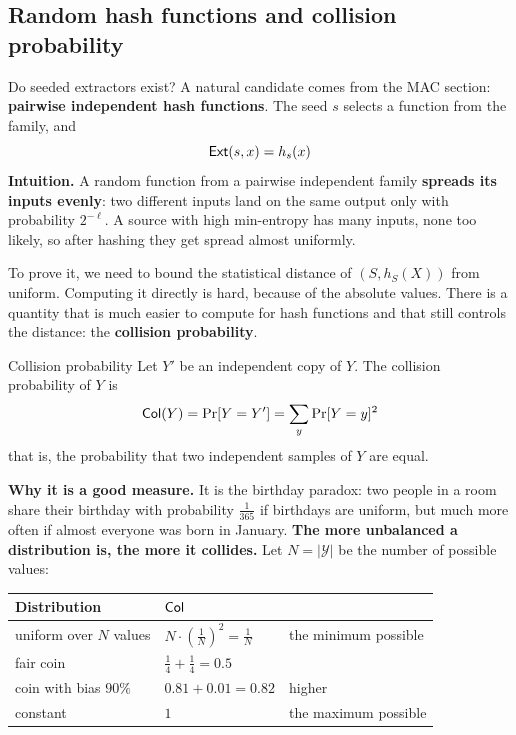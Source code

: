 \subsection{Random hash functions and collision probability}

Do seeded extractors exist? A natural candidate comes from the MAC section: \textbf{pairwise independent hash functions}. The seed $s$ selects a function from the family, and
\[
  \mathsf{Ext}(s, x) = h_s(x)
\]
\textbf{Intuition.} A random function from a pairwise independent family \textbf{spreads its inputs evenly}: two different inputs land on the same output only with probability $2^{-\ell}$. A source with high min-entropy has many inputs, none too likely, so after hashing they get spread almost uniformly.

To prove it, we need to bound the statistical distance of $(S, h_S(X))$ from uniform. Computing it directly is hard, because of the absolute values. There is a quantity that is much easier to compute for hash functions and that still controls the distance: the \textbf{collision probability}.

\begin{frameddefn}{Collision probability}
  Let $Y'$ be an independent copy of $Y$. The collision probability of $Y$ is
  \[
    \mathsf{Col}(Y) = \Pr[Y = Y'] = \sum_y \Pr[Y = y]^2
  \]
  that is, the probability that two independent samples of $Y$ are equal.
\end{frameddefn}

\textbf{Why it is a good measure.} It is the birthday paradox: two people in a room share their birthday with probability $\frac{1}{365}$ if birthdays are uniform, but much more often if almost everyone was born in January. \textbf{The more unbalanced a distribution is, the more it collides.} Let $N = |\mathcal{Y}|$ be the number of possible values:

\begin{table}[H]
  \centering
  \small
  \begin{tabular}{@{}lll@{}}
    \toprule
    \textbf{Distribution} & $\mathsf{Col}$ & \\
    \midrule
    uniform over $N$ values & $N \cdot \left(\frac{1}{N}\right)^2 = \frac{1}{N}$ & the minimum possible \\
    fair coin & $\frac{1}{4} + \frac{1}{4} = 0.5$ & \\
    coin with bias $90\%$ & $0.81 + 0.01 = 0.82$ & higher \\
    constant & $1$ & the maximum possible \\
    \bottomrule
  \end{tabular}
\end{table}

